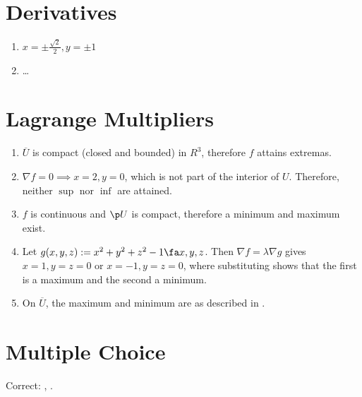 \documentclass{article}
\begin{document}

\section{Derivatives}
\begin{enumerate}[label=(\alph*)]
    \item $x = \pm \frac{\sqrt{2}}{2}, y = \pm 1$
    
    \item \dots 
\end{enumerate}

\section{Lagrange Multipliers}
\begin{enumerate}
    \item $\overline{U}$ is compact (closed and bounded) in $R^3$, therefore $f$ attains extremas. 
    
    \item $\nabla f = 0 \implies x = 2, y = 0$, which is not part of the interior of $U$. 
    Therefore, neither $\sup$ nor $\inf$ are attained. 

    \item $f$ is continuous and $\p U$ is compact, therefore a minimum and maximum exist.
    
    \item Let $g(x, y, z) := x^2 + y^2 + z^2 - 1 \fa x, y, z$. 
    Then $\nabla f = \lambda \nabla g$ gives $x = 1, y = z = 0$ or $x = -1, y = z = 0$, where substituting shows that the first is a maximum and the second a minimum.
    
    \item On $\overline{U}$, the maximum and minimum are as described in . 
\end{enumerate}

\section{Multiple Choice}
Correct: , .
\end{document}
